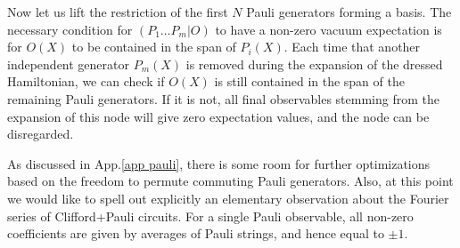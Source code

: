 \documentclass[twocolumn, amsfonts, amssymb, aps, nofootinbib]{revtex4-2}
\newcommand{\CP}{Clifford+Pauli}
\begin{document}
Now let us lift the restriction of the first $N$ Pauli generators forming a basis. The necessary condition for $(P_1\dots P_m|O)$ to have a non-zero vacuum expectation is for $O(X)$ to be contained in the span of $P_i(X)$. Each time that another independent generator $P_m(X)$ is removed during the expansion of the dressed Hamiltonian, we can check if $O(X)$ is still contained in the span of the remaining Pauli generators. If it is not, all final observables stemming from the expansion of this node will give zero expectation values, and the node can be disregarded.

As discussed in App.\ref{app pauli}, there is some room for further optimizations based on the freedom to permute commuting Pauli generators. Also, at this point we would like to spell out explicitly an elementary observation about the Fourier series of \CP{} circuits. For a single Pauli observable, all non-zero coefficients are given by averages of Pauli strings, and hence equal to $\pm1$.
\end{document}
